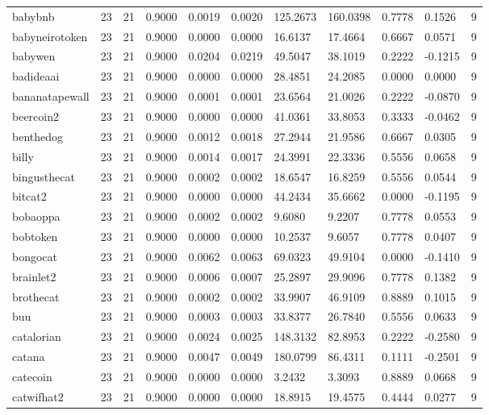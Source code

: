 \begin{table}[htbp]
\begin{tabular}{lllllllllll}
babybnb & 23 & 21 & 0.9000 & 0.0019 & 0.0020 & 125.2673 & 160.0398 & 0.7778 & 0.1526 & 9 \\
babyneirotoken & 23 & 21 & 0.9000 & 0.0000 & 0.0000 & 16.6137 & 17.4664 & 0.6667 & 0.0571 & 9 \\
babywen & 23 & 21 & 0.9000 & 0.0204 & 0.0219 & 49.5047 & 38.1019 & 0.2222 & -0.1215 & 9 \\
badideaai & 23 & 21 & 0.9000 & 0.0000 & 0.0000 & 28.4851 & 24.2085 & 0.0000 & 0.0000 & 9 \\
bananatapewall & 23 & 21 & 0.9000 & 0.0001 & 0.0001 & 23.6564 & 21.0026 & 0.2222 & -0.0870 & 9 \\
beercoin2 & 23 & 21 & 0.9000 & 0.0000 & 0.0000 & 41.0361 & 33.8053 & 0.3333 & -0.0462 & 9 \\
benthedog & 23 & 21 & 0.9000 & 0.0012 & 0.0018 & 27.2944 & 21.9586 & 0.6667 & 0.0305 & 9 \\
billy & 23 & 21 & 0.9000 & 0.0014 & 0.0017 & 24.3991 & 22.3336 & 0.5556 & 0.0658 & 9 \\
bingusthecat & 23 & 21 & 0.9000 & 0.0002 & 0.0002 & 18.6547 & 16.8259 & 0.5556 & 0.0544 & 9 \\
bitcat2 & 23 & 21 & 0.9000 & 0.0000 & 0.0000 & 44.2434 & 35.6662 & 0.0000 & -0.1195 & 9 \\
bobaoppa & 23 & 21 & 0.9000 & 0.0002 & 0.0002 & 9.6080 & 9.2207 & 0.7778 & 0.0553 & 9 \\
bobtoken & 23 & 21 & 0.9000 & 0.0000 & 0.0000 & 10.2537 & 9.6057 & 0.7778 & 0.0407 & 9 \\
bongocat & 23 & 21 & 0.9000 & 0.0062 & 0.0063 & 69.0323 & 49.9104 & 0.0000 & -0.1410 & 9 \\
brainlet2 & 23 & 21 & 0.9000 & 0.0006 & 0.0007 & 25.2897 & 29.9096 & 0.7778 & 0.1382 & 9 \\
brothecat & 23 & 21 & 0.9000 & 0.0002 & 0.0002 & 33.9907 & 46.9109 & 0.8889 & 0.1015 & 9 \\
buu & 23 & 21 & 0.9000 & 0.0003 & 0.0003 & 33.8377 & 26.7840 & 0.5556 & 0.0633 & 9 \\
catalorian & 23 & 21 & 0.9000 & 0.0024 & 0.0025 & 148.3132 & 82.8953 & 0.2222 & -0.2580 & 9 \\
catana & 23 & 21 & 0.9000 & 0.0047 & 0.0049 & 180.0799 & 86.4311 & 0.1111 & -0.2501 & 9 \\
catecoin & 23 & 21 & 0.9000 & 0.0000 & 0.0000 & 3.2432 & 3.3093 & 0.8889 & 0.0668 & 9 \\
catwifhat2 & 23 & 21 & 0.9000 & 0.0000 & 0.0000 & 18.8915 & 19.4575 & 0.4444 & 0.0277 & 9 \\

\end{tabular}
\end{table}
